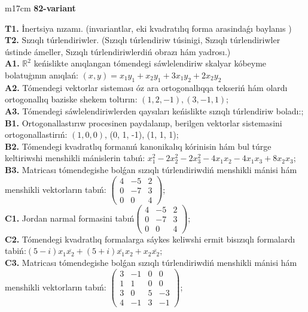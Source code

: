 \documentclass{article}
\begin{document}
\begin{tabular}{m{17cm}}
\textbf{82-variant}
\newline

\textbf{T1.} İnertsiya nızamı. (invariantlar,  eki kvadratılıq forma arasindaǵı baylanıs ) \\
\textbf{T2.} Sızıqlı túrlendiriwler.  (Sızıqlı túrlendiriw túsinigi, Sızıqlı túrlendiriwler ústinde ámeller, Sızıqlı túrlendiriwlerdiń obrazı hám yadrosı.) \\
\textbf{A1.} \(\mathbb{R}^{2}\) keńislikte anıqlangan tómendegi sáwlelendiriw skalyar kóbeyme bolatuģının anıqlań: \((x,y) = x_{1}y_{1} + x_{2}y_{1} + 3x_{1}y_{2} + 2x_{2}y_{2}\) \\
\textbf{A2.} Tómendegi vektorlar sisteması óz ara ortogonallıqqa tekseriń hám olardı ortogonallıq baziske shekem toltırın: \((1,2, - 1),(3, - 1,1)\); \\
\textbf{A3.} Tómendegi sáwlelendiriwlerden qaysıları keńislikte sızıqlı túrlendiriw boladı:; \\
\textbf{B1.} Ortogonallastırıw procesinen paydalanıp, berilgen vektorlar sistemasini ortogonallastirıń: \((1,0,0)\), (0, 1, -1), (1, 1, 1); \\
\textbf{B2.} Tómendegi kvadratlıq formanıń kanonikalıq kórinisin hám bul túrge keltiriwshi menshikli mánislerin tabıń: \(x_{1}^{2} - 2x_{2}^{2} - 2x_{3}^{2} - 4x_{1}x_{2} - 4x_{1}x_{3} + 8x_{2}x_{3}\); \\
\textbf{B3.} Matricası tómendegishe bolǵan sızıqlı túrlendiriwdiń menshikli mánisi hám menshikli vektorların tabıń: \(\begin{pmatrix} 4 & - 5 & 2 \\ 0 & - 7 & 3 \\ 0 & 0 & 4 \end{pmatrix}\); \\
\textbf{C1.} Jordan narmal formasini tabıń\(\begin{pmatrix} 4 & - 5 & 2 \\ 0 & - 7 & 3 \\ 0 & 0 & 4 \end{pmatrix}\); \\
\textbf{C2.} Tómendegi kvadratlıq formalarga sáykes keliwshi ermit bisızıqlı formalardı tabiń:\((5 - i)x_{1}\overline{x_{2}} + (5 + i)\overline{x_{1}}x_{2} + x_{2}\overline{x_{2}}\); \\
\textbf{C3.} Matricası tómendegishe bolǵan sızıqlı túrlendiriwdiń menshikli mánisi hám menshikli vektorların tabıń: \(\begin{pmatrix} 3 & - 1 & 0 & 0 \\ 1 & 1 & 0 & 0 \\ 3 & 0 & 5 & - 3 \\ 4 & - 1 & 3 & - 1 \end{pmatrix}\); \\

\end{tabular}
\vspace{1cm}
\end{document}
